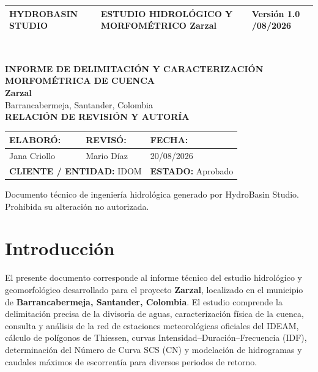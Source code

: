 \documentclass[11pt,a4paper]{article}
\begin{document}
\begin{titlepage}
\vspace*{0.8cm}
\noindent
\begin{tabular}{|p{4.2cm}|p{8.0cm}|p{3.4cm}|}\hline
\textbf{\color{hbaccent}HYDROBASIN STUDIO} & \textbf{ESTUDIO HIDROLÓGICO Y MORFOMÉTRICO} \newline \small Zarzal & \small Versión 1.0 \newline 20/08/2026 \\\hline
\end{tabular}\\[2.0cm]

\begin{center}
{\Huge\bfseries INFORME DE DELIMITACIÓN Y CARACTERIZACIÓN MORFOMÉTRICA DE CUENCA}\\[0.6cm]
{\Large\bfseries Zarzal}\\[0.3cm]
{\normalsize Barrancabermeja, Santander, Colombia}\\[2.2cm]

\textbf{RELACIÓN DE REVISIÓN Y AUTORÍA}\\[3mm]
\begin{tabular}{|p{4.5cm}|p{5.0cm}|p{4.5cm}|}\hline
\textbf{ELABORÓ:} & \textbf{REVISÓ:} & \textbf{FECHA:} \\\hline
Jana Criollo & Mario Díaz & 20/08/2026 \\\hline
\multicolumn{2}{|l|}{\textbf{CLIENTE / ENTIDAD:} IDOM} & \textbf{ESTADO:} Aprobado \\\hline
\end{tabular}
\end{center}

\vfill
\noindent
{\footnotesize Documento técnico de ingeniería hidrológica generado por HydroBasin Studio. Prohibida su alteración no autorizada.}
\end{titlepage}

\tableofcontents
\vspace{0.6cm}
\listoffigures
\vspace{0.6cm}
\listoftables
\newpage

\section{Introducción}
El presente documento corresponde al informe técnico del estudio hidrológico y geomorfológico desarrollado para el proyecto \textbf{Zarzal}, localizado en el municipio de \textbf{Barrancabermeja, Santander, Colombia}. El estudio comprende la delimitación precisa de la divisoria de aguas, caracterización física de la cuenca, consulta y análisis de la red de estaciones meteorológicas oficiales del IDEAM, cálculo de polígonos de Thiessen, curvas Intensidad--Duración--Frecuencia (IDF), determinación del Número de Curva SCS (CN) y modelación de hidrogramas y caudales máximos de escorrentía para diversos periodos de retorno.
\end{document}
